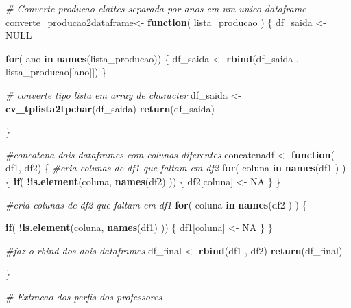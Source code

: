 \documentclass[]{article}
\newenvironment{Shaded}{\begin{snugshade}}{\end{snugshade}}
\newcommand{\KeywordTok}[1]{\textcolor[rgb]{0.13,0.29,0.53}{\textbf{#1}}}
\newcommand{\StringTok}[1]{\textcolor[rgb]{0.31,0.60,0.02}{#1}}
\newcommand{\CommentTok}[1]{\textcolor[rgb]{0.56,0.35,0.01}{\textit{#1}}}
\newcommand{\OtherTok}[1]{\textcolor[rgb]{0.56,0.35,0.01}{#1}}
\newcommand{\ControlFlowTok}[1]{\textcolor[rgb]{0.13,0.29,0.53}{\textbf{#1}}}
\newcommand{\OperatorTok}[1]{\textcolor[rgb]{0.81,0.36,0.00}{\textbf{#1}}}
\newcommand{\NormalTok}[1]{#1}
\begin{document}
\begin{Shaded}
\begin{Highlighting}[]
\CommentTok{# Converte producao elattes separada por anos em um unico dataframe }
\NormalTok{converte_producao2dataframe<-}\StringTok{ }\ControlFlowTok{function}\NormalTok{( lista_producao ) \{}
\NormalTok{  df_saida <-}\StringTok{ }\OtherTok{NULL} 
  
  \ControlFlowTok{for}\NormalTok{( ano }\ControlFlowTok{in} \KeywordTok{names}\NormalTok{(lista_producao)) \{}
\NormalTok{    df_saida <-}\StringTok{ }\KeywordTok{rbind}\NormalTok{(df_saida , lista_producao[[ano]])}
\NormalTok{  \}}
  
  \CommentTok{# converte tipo lista em array de character }
\NormalTok{  df_saida <-}\StringTok{ }\KeywordTok{cv_tplista2tpchar}\NormalTok{(df_saida)}
  \KeywordTok{return}\NormalTok{(df_saida)}
  

\NormalTok{\}}

\CommentTok{#concatena dois dataframes com  colunas diferentes }
\NormalTok{concatenadf <-}\StringTok{ }\ControlFlowTok{function}\NormalTok{( df1, df2) \{ }
  \CommentTok{#cria colunas de df1 que faltam em df2}
  \ControlFlowTok{for}\NormalTok{( coluna }\ControlFlowTok{in} \KeywordTok{names}\NormalTok{(df1 ) ) \{}
    \ControlFlowTok{if}\NormalTok{( }\OperatorTok{!}\KeywordTok{is.element}\NormalTok{(coluna, }\KeywordTok{names}\NormalTok{(df2) )) \{}
\NormalTok{      df2[coluna] <-}\StringTok{ }\OtherTok{NA}
\NormalTok{    \}}
\NormalTok{  \}}
  
  \CommentTok{#cria colunas de df2 que faltam em df1  }
  \ControlFlowTok{for}\NormalTok{( coluna }\ControlFlowTok{in} \KeywordTok{names}\NormalTok{(df2 ) ) \{}
    
    \ControlFlowTok{if}\NormalTok{( }\OperatorTok{!}\KeywordTok{is.element}\NormalTok{(coluna, }\KeywordTok{names}\NormalTok{(df1) )) \{}
\NormalTok{      df1[coluna] <-}\StringTok{ }\OtherTok{NA}
\NormalTok{    \}}
\NormalTok{  \}}
  
  
  \CommentTok{#faz o rbind dos dois dataframes }
\NormalTok{  df_final <-}\StringTok{ }\KeywordTok{rbind}\NormalTok{(df1 , df2)}
  \KeywordTok{return}\NormalTok{(df_final)}
  
\NormalTok{\}}

\CommentTok{# Extracao dos perfis dos professores }


\end{Highlighting}
\end{Shaded}
\end{document}
